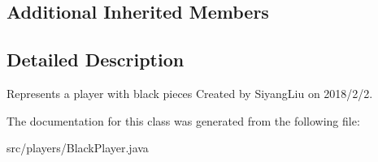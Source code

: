 \subsection*{Additional Inherited Members}


\subsection{Detailed Description}
Represents a player with black pieces Created by Siyang\+Liu on 2018/2/2. 

The documentation for this class was generated from the following file\+:\begin{DoxyCompactItemize}
\item 
src/players/Black\+Player.\+java\end{DoxyCompactItemize}

